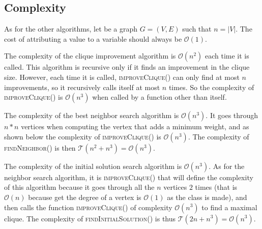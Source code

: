 
\subsection{Complexity}

As for the other algorithms, let be a graph $G=(V,E)$ such that $n=|V|$. The cost 
of attributing a value to a variable should always be $\mathcal{O}(1)$.
\bigskip

The complexity of the clique improvement algorithm is $\mathcal{O}(n^2)$ each time it is called. 
\newpage
This algorithm is recursive only if it finds an improvement in the clique size. However, each 
time it is called, \textsc{improveClique()} can only find at most $n$ improvements, so it 
recursively calls itself at most $n$ times. So the complexity of \textsc{improveClique()} is 
$\mathcal{O}(n^3)$ when called by a function other than itself.
\bigskip

The complexity of the best neighbor search algorithm is $\mathcal{O}(n^3)$. It goes through 
$n*n$ vertices when computing the vertex that adds a minimum weight, and as shown below the 
complexity of \textsc{improveClique()} is $\mathcal{O}(n^3)$. The complexity of 
\textsc{findNeighbor()} is then $\mathcal{T}(n^2 + n^3) = \mathcal{O}(n^3)$.
\bigskip

The complexity of the initial solution search algorithm is $\mathcal{O}(n^3)$. As for the 
neighbor search algorithm, it is \textsc{improveClique()} that will define the complexity of 
this algorithm because it goes through all the $n$ vertices $2$ times (that is $\mathcal{O}(n)$ 
because get the degree of a vertex is $\mathcal{O}(1)$ as the class is made), and then calls 
the function \textsc{improveClique()} of complexity $\mathcal{O}(n^3)$ to find a maximal clique. 
The complexity of \textsc{findInitialSolution()} is thus $\mathcal{T}(2n + n^3) = \mathcal{O}(n^3)$.
\bigskip

